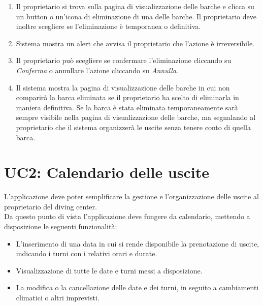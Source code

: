 \begin{enumerate}
    \item Il proprietario si trova sulla pagina di visualizzazione delle barche e clicca su un button o un'icona di eliminazione di una delle barche. Il proprietario deve inoltre
          scegliere se l'eliminazione è temporanea o definitiva.
    \item Sistema mostra un alert che avvisa il proprietario che l'azione è irreversibile.
    \item Il proprietario può scegliere se confermare l'eliminazione cliccando su \textit{Conferma} o annullare l'azione cliccando su \textit{Annulla}.
    \item Il sistema mostra la pagina di visualizzazione delle barche in cui non comparirà la barca eliminata se il proprietario ha scelto di eliminarla in maniera definitiva.
          Se la barca è stata eliminata temporaneamente sarà sempre visibile nella pagina di visualizzazione delle barche, ma segnalando al proprietario che il sistema organizzerà
          le uscite senza tenere conto di quella barca.
\end{enumerate}

\section{UC2: Calendario delle uscite}
L'applicazione deve poter semplificare la gestione e l'organizzazione delle uscite al proprietario del diving center.
\\Da questo punto di vista l'applicazione deve fungere da calendario, mettendo a disposizione le seguenti funzionalità:

\begin{itemize}
    \item L'inserimento di una data in cui si rende disponibile la prenotazione di uscite, indicando i turni con i relativi orari e durate.
    \item Visualizzazione di tutte le date e turni messi a disposizione.
    \item La modifica o la cancellazione delle date e dei turni, in seguito a cambiamenti climatici o altri imprevisti.
\end{itemize}

